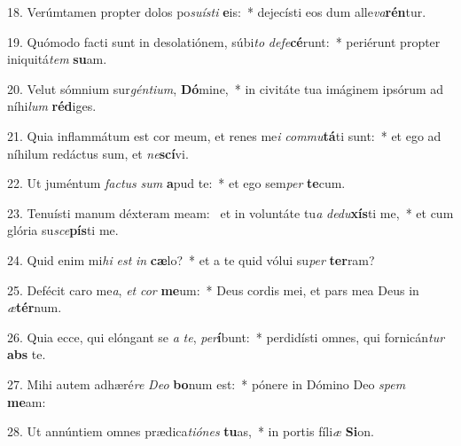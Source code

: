 18. Verúmtamen propter dolos po\textit{su}\textit{ís}\textit{ti} \textbf{e}is:~*  dejecísti eos dum alle\textit{va}\textbf{rén}tur.\

19. Quómodo facti sunt in desolatiónem, súbi\textit{to} \textit{de}\textit{fe}\textbf{cé}runt:~*  periérunt propter iniquitá\textit{tem} \textbf{su}am.\

20. Velut sómnium sur\textit{gén}\textit{ti}\textit{um}, \textbf{Dó}mine,~*  in civitáte tua imáginem ipsórum ad níhi\textit{lum} \textbf{réd}iges.\

21. Quia inflammátum est cor meum, et renes me\textit{i} \textit{com}\textit{mu}\textbf{tá}ti sunt:~*  et ego ad níhilum redáctus sum, et \textit{ne}\textbf{scí}vi.\

22. Ut juméntum \textit{fac}\textit{tus} \textit{sum} \textbf{a}pud te:~*  et ego sem\textit{per} \textbf{te}cum.\

23. Tenuísti manum déxteram meam: \dag\  et in voluntáte tu\textit{a} \textit{de}\textit{du}\textbf{xís}ti me,~*  et cum glória su\textit{sce}\textbf{pís}ti me.\

24. Quid enim mi\textit{hi} \textit{est} \textit{in} \textbf{cæ}lo?~*  et a te quid vólui su\textit{per} \textbf{ter}ram?\

25. Defécit caro me\textit{a}, \textit{et} \textit{cor} \textbf{me}um:~*  Deus cordis mei, et pars mea Deus in \textit{æ}\textbf{tér}num.\

26. Quia ecce, qui elóngant se \textit{a} \textit{te}, \textit{per}\textbf{í}bunt:~*  perdidísti omnes, qui fornicán\textit{tur} \textbf{abs} te.\

27. Mihi autem adhæré\textit{re} \textit{De}\textit{o} \textbf{bo}num est:~*  pónere in Dómino Deo \textit{spem} \textbf{me}am:\

28. Ut annúntiem omnes prædica\textit{ti}\textit{ó}\textit{nes} \textbf{tu}as,~*  in portis fíli\textit{æ} \textbf{Si}on.\


